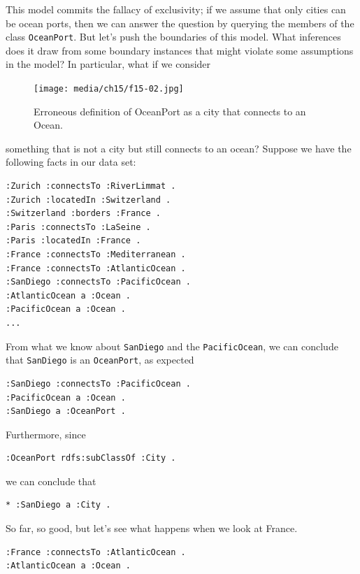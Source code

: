 This model commits the fallacy of exclusivity; if we assume that only
cities can be ocean ports, then we can answer the question by querying
the members of the class \texttt{OceanPort}. But let's push the boundaries of
this model. What inferences does it draw from some boundary instances
that might violate some assumptions in the model? In particular, what if
we consider


\begin{figure}
\centering
\texttt{[image: media/ch15/f15-02.jpg]}
\caption{Erroneous definition of OceanPort as a city that connects to an Ocean.}
\label{fig:ch15.02}
\end{figure}



something that is not a city but still connects to an ocean? Suppose we
have the following facts in our data set:

\begin{lstlisting}
:Zurich :connectsTo :RiverLimmat .
:Zurich :locatedIn :Switzerland .
:Switzerland :borders :France .
:Paris :connectsTo :LaSeine .
:Paris :locatedIn :France .
:France :connectsTo :Mediterranean .
:France :connectsTo :AtlanticOcean .
:SanDiego :connectsTo :PacificOcean .
:AtlanticOcean a :Ocean .
:PacificOcean a :Ocean .
...
\end{lstlisting}

From what we know about \texttt{SanDiego} and the \texttt{PacificOcean}, we can conclude
that
\texttt{SanDiego} is an \texttt{OceanPort}, as expected

\begin{lstlisting}
:SanDiego :connectsTo :PacificOcean .
:PacificOcean a :Ocean .
:SanDiego a :OceanPort .
\end{lstlisting}

Furthermore, since

\begin{lstlisting}
:OceanPort rdfs:subClassOf :City .
\end{lstlisting}

we can conclude that

\begin{lstlisting}
* :SanDiego a :City .
\end{lstlisting}

So far, so good, but let's see what happens when we look at France.

\begin{lstlisting}
:France :connectsTo :AtlanticOcean .
:AtlanticOcean a :Ocean .
\end{lstlisting}

